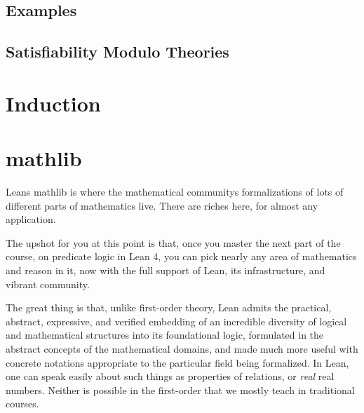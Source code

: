 \documentclass{book}
\begin{document}
\hypertarget{book__pandoc__debug__src__dmt1__lectures__l05_theoryextensions__examples.lean.md}{}
\hypertarget{book__pandoc__debug__src__dmt1__lectures__l05_theoryextensions__examples.lean.md__examples}{%
\section{Examples}\label{book__pandoc__debug__src__dmt1__lectures__l05_theoryextensions__examples.lean.md__examples}}

\hypertarget{book__pandoc__debug__src__smt.md}{}
\hypertarget{book__pandoc__debug__src__smt.md__satisfiability-modulo-theories}{%
\section{Satisfiability Modulo Theories}\label{book__pandoc__debug__src__smt.md__satisfiability-modulo-theories}}

\hypertarget{book__pandoc__debug__src__dmt1__lectures__l06_induction__induction.lean.md}{}
\hypertarget{book__pandoc__debug__src__dmt1__lectures__l06_induction__induction.lean.md__induction}{%
\chapter{Induction}\label{book__pandoc__debug__src__dmt1__lectures__l06_induction__induction.lean.md__induction}}

\hypertarget{book__pandoc__debug__src__mathlib.md}{}
\hypertarget{book__pandoc__debug__src__mathlib.md__mathlib}{%
\chapter{mathlib}\label{book__pandoc__debug__src__mathlib.md__mathlib}}

Lean\textquotesingle s mathlib is where the mathematical community\textquotesingle s formalizations
of lots of different parts of mathematics live. There are riches here,
for almost any application.

The upshot for you at this point is that, once you master the next part of the course, on predicate logic in Lean 4, you can pick nearly any area
of mathematics and reason in it, now with the full support of Lean, its infrastructure, and vibrant community.

The great thing is that, unlike first-order theory, Lean admits the practical, abstract, expressive, and verified embedding of an incredible diversity of logical and mathematical structures into its foundational logic, formulated in the abstract concepts of the mathematical domains, and made much more useful with concrete notations appropriate to the particular field being formalized. In Lean, one can speak easily about such things as properties of relations, or \emph{real} real numbers. Neither is possible in the first-order that we mostly teach in traditional courses.
\end{document}
